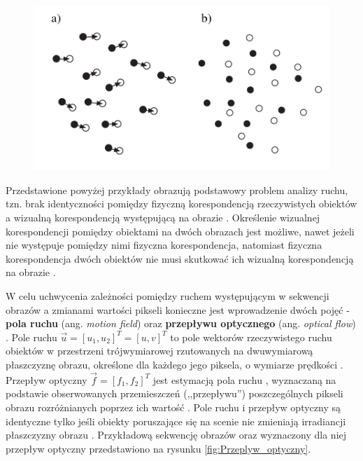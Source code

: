 \begin{figure}[!htb]
	\begin{center}
		\includegraphics[width=12cm]{images/correspondence_problem.png}
	\end{center}	
\label{fig:Problem_korespondencji}
\end{figure}

Przedstawione powyżej przykłady obrazują podstawowy problem analizy ruchu, tzn. brak identyczności pomiędzy fizyczną korespondencją rzeczywistych obiektów a wizualną korespondencją występującą na obrazie \cite{Jaehne2005}. Określenie wizualnej korespondencji pomiędzy obiektami na dwóch obrazach jest możliwe, nawet jeżeli nie występuje pomiędzy nimi fizyczna korespondencja, natomiast fizyczna korespondencja dwóch obiektów nie musi skutkować ich wizualną korespondencją na obrazie \cite{Jaehne2005}.

W celu uchwycenia zależności pomiędzy ruchem występującym w sekwencji obrazów a zmianami wartości pikseli konieczne jest wprowadzenie dwóch pojęć - \textbf{pola ruchu} (ang. \textit{motion field}) oraz \textbf{przepływu optycznego} (ang. \textit{optical flow}) \cite{Jaehne2005}. Pole ruchu $\vec{u} = [u_1, u_2]^T = [u, v]^T$ to pole wektorów rzeczywistego ruchu obiektów w przestrzeni trójwymiarowej rzutowanych na dwuwymiarową płaszczyznę obrazu, określone dla każdego jego piksela, o wymiarze prędkości \cite{Jaehne2005} \cite{Baker2011}. Przepływ optyczny $\vec{f} = [f_1, f_2]^T$ jest estymacją pola ruchu \cite{Szeliski2011}, wyznaczaną na podstawie obserwowanych przemieszczeń (,,przepływu'') poszczególnych pikseli obrazu rozróżnianych poprzez ich wartość \cite{Jaehne2005} \cite{Baker2011} \cite{Horn1981}. Pole ruchu i przepływ optyczny są identyczne tylko jeśli obiekty poruszające się na scenie nie zmieniają irradiancji płaszczyzny obrazu \cite{Jaehne2005}. Przykładową sekwencję obrazów oraz wyznaczony dla niej przepływ optyczny przedstawiono na rysunku \ref{fig:Przeplyw_optyczny}.

